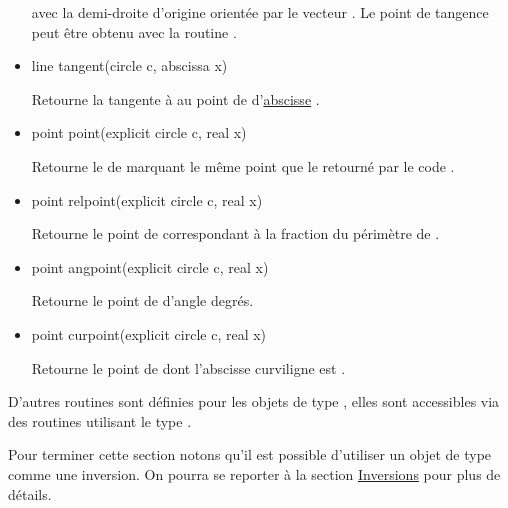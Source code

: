 \documentclass[pdftex]{article}
\begin{document}
\begin{itemize}
  avec la demi-droite d'origine  orientée par le
  vecteur . Le point de tangence peut être obtenu avec la routine
  .
\item {}
  \begin{Vcolor}
    line tangent(circle c, abscissa x)
  \end{Vcolor}
  Retourne la tangente à  au point de 
  d'\href{#section.abscissa}{abscisse} .
\item {}
  \begin{Vcolor}
    point point(explicit circle c, real x)
  \end{Vcolor}
  Retourne le  de  marquant le même
  point que le  retourné par le code
  .
\item {}
  \begin{Vcolor}
    point relpoint(explicit circle c, real x)
  \end{Vcolor}
  Retourne le point de  correspondant à la fraction 
  du périmètre de .
\item {}
  \begin{Vcolor}
    point angpoint(explicit circle c, real x)
  \end{Vcolor}
  Retourne le point de  d'angle  degrés.
\item {}
  \begin{Vcolor}
    point curpoint(explicit circle c, real x)
  \end{Vcolor}
  Retourne le point de  dont l'abscisse curviligne est .
\end{itemize}
D'autres routines sont définies pour les objets de type ,
elles sont accessibles via des routines utilisant le type .

Pour terminer cette section notons qu'il est possible d'utiliser un objet
de type  comme une inversion. On pourra se
reporter à la section \href{#section.inversion}{Inversions} pour plus
de détails.
\end{document}

